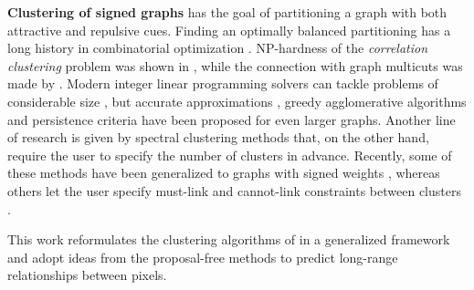 \textbf{Clustering of signed graphs} has the goal of partitioning a graph with both attractive and repulsive cues. Finding an optimally balanced partitioning has a long history in combinatorial optimization \cite{grotschel1989cutting,grotschel1990facets,chopra1993partition}. %
NP-hardness of the \emph{correlation clustering} problem was shown in \cite{bansal2004correlation}, while the connection with graph multicuts was made by \cite{demaine2006correlation}. Modern integer linear programming solvers can tackle problems of considerable size \cite{andres2012globally}, but accurate approximations \cite{pape2017solving,beier2016efficient,yarkony2012fast}, greedy agglomerative algorithms \cite{levinkov2017comparative,wolf2019mutex,keuper2015efficient,kardoostsolving} and persistence criteria \cite{lange2018partial,lange2018combinatorial} have been proposed for even larger graphs. 
Another line of research is given by spectral clustering methods that, on the other hand, require the user to specify the number of clusters in advance. Recently, some of these methods have been generalized to graphs with signed weights \cite{Cucuringu2019SPONGEAG,chiang2012scalable,kunegis2010spectral}, whereas others let the user specify must-link and cannot-link constraints between clusters \cite{rangapuram2012constrained,wang2014constrained,cucuringu2016simple}.

This work reformulates the clustering algorithms of \cite{levinkov2017comparative,wolf2018mutex,keuper2015efficient} in a generalized framework and adopt ideas from the proposal-free methods \cite{liu2018affinity,wolf2018mutex,lee2017superhuman} to predict long-range relationships between pixels.
